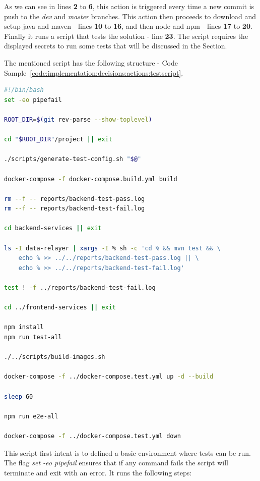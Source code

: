 As we can see in lines \textbf{2} to \textbf{6}, this action is triggered every time a new commit is push to the \textit{dev} and \textit{master} branches.
This action then proceeds to download and setup java and maven - lines \textbf{10} to \textbf{16}, and then node and npm - lines \textbf{17} to \textbf{20}. Finally it runs a script that tests the solution - line \textbf{23}. The script requires the displayed secrets to run some tests that will be discussed in the  Section.

The mentioned script has the following structure - Code Sample~\ref{code:implementation:decisions:actions:testscript}.

\begin{lstlisting}[language=bash, style=bash, caption=Sensae Console Test Suite Script, label={code:implementation:decisions:actions:testscript}]
#!/bin/bash
set -eo pipefail

ROOT_DIR=$(git rev-parse --show-toplevel)

cd "$ROOT_DIR"/project || exit

./scripts/generate-test-config.sh "$@"

docker-compose -f docker-compose.build.yml build

rm --f -- reports/backend-test-pass.log
rm --f -- reports/backend-test-fail.log

cd backend-services || exit

ls -I data-relayer | xargs -I % sh -c 'cd % && mvn test && \
    echo % >> ../../reports/backend-test-pass.log || \
    echo % >> ../../reports/backend-test-fail.log'

test ! -f ../reports/backend-test-fail.log

cd ../frontend-services || exit

npm install
npm run test-all

./../scripts/build-images.sh

docker-compose -f ../docker-compose.test.yml up -d --build

sleep 60

npm run e2e-all

docker-compose -f ../docker-compose.test.yml down
\end{lstlisting}

This script first intent is to defined a basic environment where tests can be run.
The flag \textit{set -eo pipefail} ensures that if any command fails the script will terminate and exit with an error.
It runs the following steps:

